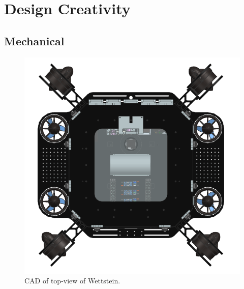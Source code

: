 \documentclass[conference]{IEEEtran}
\begin{document}



\section{Design Creativity}
\label{sec:design}


\subsection{Mechanical}
\label{ssec:mechanical}

\begin{figure}[h]
    \centerline{\includegraphics[scale=0.19]{images/fullSubTop2024.png}}
    \caption{CAD of top-view of Wettstein.}
    \label{fig:sub3}
\end{figure}
\end{document}
